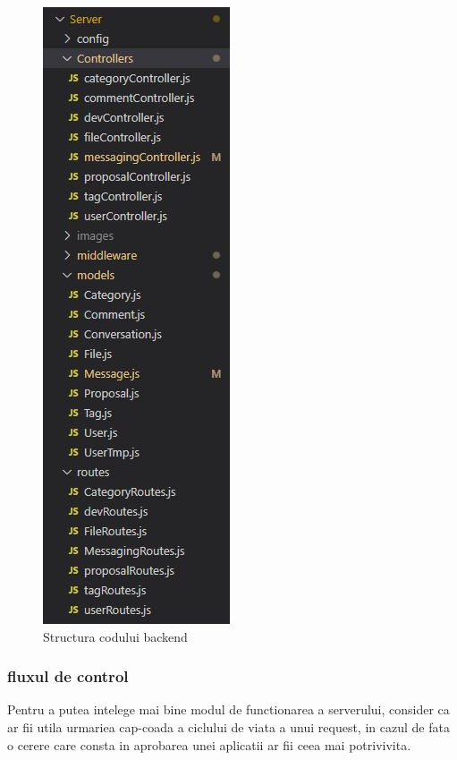 \documentclass[12pt,a4paper,hidelinks]{report}
\theoremstyle{definition}
\theoremstyle{remark}
\begin{document}
    \begin{figure}[H]
        \centering
        \includegraphics[scale=1]{images/MVC.JPG}
        \caption{Structura codului backend}
        \label{fig:backEndCodeStructure}
    \end{figure}
    \subsubsection{fluxul de control}
    Pentru a putea intelege mai bine modul de functionarea a serverului, consider ca ar fii utila urmariea cap-coada a ciclului de viata a unui request, 
    in cazul de fata o cerere care consta in aprobarea unei aplicatii ar fii ceea mai potrivivita.
    
\end{document}
